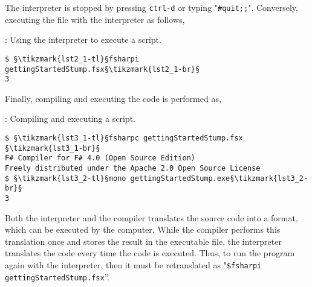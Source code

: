 The interpreter is stopped by pressing \lstinline[language=console]{ctrl-d} or typing "\lstinline[language=console]{#quit;;}". Conversely, executing the file with the interpreter as follows,
\begin{codeNOutput}{: Using the interpreter to execute a script.}
\begin{lstlisting}[language=console,escapechar=§]
$ §\tikzmark{lst2_1-tl}§fsharpi gettingStartedStump.fsx§\tikzmark{lst2_1-br}§
3
\end{lstlisting}%
\end{codeNOutput}
%
 Finally, compiling and executing the code is performed as,
\begin{codeNOutput}{: Compiling and executing a script.}
\begin{lstlisting}[language=console,escapechar=§]
$ §\tikzmark{lst3_1-tl}§fsharpc gettingStartedStump.fsx §\tikzmark{lst3_1-br}§
F# Compiler for F# 4.0 (Open Source Edition)
Freely distributed under the Apache 2.0 Open Source License
$ §\tikzmark{lst3_2-tl}§mono gettingStartedStump.exe§\tikzmark{lst3_2-br}§
3
\end{lstlisting}
\end{codeNOutput}
%
%
 Both the interpreter and the compiler translates the source code into a format, which can be executed by the computer. While the compiler performs this translation once and stores the result in the executable file, the interpreter translates the code every time the code is executed. Thus, to run the program again with the interpreter, then it must be retranslated as "\lstinline[language=console]{$fsharpi gettingStartedStump.fsx}''. %
